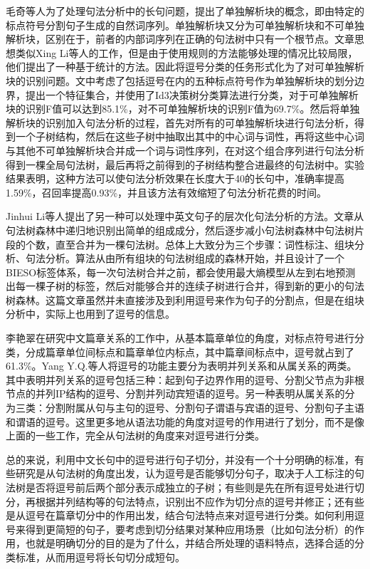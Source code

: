 \documentclass[master, winfont]{njuthesis}
\begin{document}
毛奇等人\cite{Mao2007}为了处理句法分析中的长句问题，提出了单独解析块的概念，即由特定的标点符号分割句子生成的自然词序列。单独解析块又分为可单独解析块和不可单独解析块，区别在于，前者的内部词序列在正确的句法树中只有一个根节点。文章思想类似Xing Li等人\cite{Li2004}的工作，但是由于使用规则的方法能够处理的情况比较局限，他们提出了一种基于统计的方法。因此将逗号分类的任务形式化为了对可单独解析块的识别问题。文中考虑了包括逗号在内的五种标点符号作为单独解析块的划分边界，提出一个特征集合，并使用了Id3决策树分类算法进行分类，对于可单独解析块的识别F值可以达到85.1\%，对不可单独解析块的识别F值为69.7\%。然后将单独解析块的识别加入句法分析的过程，首先对所有的可单独解析块进行句法分析，得到一个子树结构，然后在这些子树中抽取出其中的中心词与词性，再将这些中心词与其他不可单独解析块合并成一个词与词性序列，在对这个组合序列进行句法分析得到一棵全局句法树，最后再将之前得到的子树结构整合进最终的句法树中。实验结果表明，这种方法可以使句法分析效果在长度大于40的长句中，准确率提高1.59\%，召回率提高0.93\%，并且该方法有效缩短了句法分析花费的时间。

Jinhui Li等人\cite{Li2008}提出了另一种可以处理中英文句子的层次化句法分析的方法。文章从句法树森林中递归地识别出简单的组成成分，然后逐步减小句法树森林中句法树片段的个数，直至合并为一棵句法树。总体上大致分为三个步骤：词性标注、组块分析、句法分析。算法从由所有组块的句法树组成的森林开始，并且设计了一个BIESO标签体系，每一次句法树合并之前，都会使用最大熵模型从左到右地预测出每一棵子树的标签，然后对能够合并的连续子树进行合并，得到新的更小的句法树森林。这篇文章虽然并未直接涉及到利用逗号来作为句子的分割点，但是在组块分析中，实际上也用到了逗号的信息。

李艳翠\cite{liyancui2015}在研究中文篇章关系的工作中，从基本篇章单位的角度，对标点符号进行分类，分成篇章单位间标点和篇章单位内标点，其中篇章间标点中，逗号就占到了61.3\%。Yang Y.Q.等人\cite{Yang2012Chinese}将逗号的功能主要分为表明并列关系和从属关系的两类。其中表明并列关系的逗号包括三种：起到句子边界作用的逗号、分割父节点为非根节点的并列IP结构的逗号、分割并列动宾短语的逗号。另一种表明从属关系的分为三类：分割附属从句与主句的逗号、分割句子谓语与宾语的逗号、分割句子主语和谓语的逗号。这里更多地从语法功能的角度对逗号的作用进行了划分，而不是像上面的一些工作，完全从句法树的角度来对逗号进行分类。

总的来说，利用中文长句中的逗号进行句子切分，并没有一个十分明确的标准，有些研究是从句法树的角度出发，认为逗号是否能够切分句子，取决于人工标注的句法树是否将逗号前后两个部分表示成独立的子树；有些则是先在所有逗号处进行切分，再根据并列结构等的句法特点，识别出不应作为切分点的逗号并修正；还有些是从逗号在篇章切分中的作用出发，结合句法特点来对逗号进行分类。如何利用逗号来得到更简短的句子，要考虑到切分结果对某种应用场景（比如句法分析）的作用，也就是明确切分的目的是为了什么，并结合所处理的语料特点，选择合适的分类标准，从而用逗号将长句切分成短句。
\end{document}
